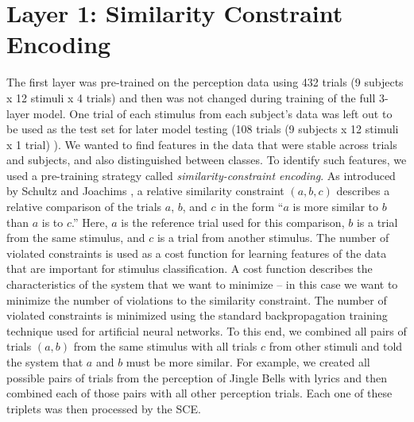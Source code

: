 \section{Layer 1: Similarity Constraint Encoding}
The first layer was pre-trained on the perception data using 432 trials (9 subjects x 12 stimuli x 4 trials) and then was not changed during training of the full 3-layer model. 
One trial of each stimulus from each subject's data was left out to be used as the test set for later model testing (108 trials (9 subjects x 12 stimuli x 1 trial) ).
We wanted to find features in the data that were stable across trials and subjects, and also distinguished between classes. 
To identify such features, we used a pre-training strategy called \emph{similarity-constraint encoding}.
As introduced by Schultz and Joachims \citeyear{schultz_learning_2004}, a relative similarity constraint $(a,b,c)$ describes a relative comparison of the trials $a$, $b$, and $c$ in the form ``$a$ is more similar to $b$ than $a$ is to $c$.''
Here, $a$ is the reference trial used for this comparison, $b$ is a trial from the same stimulus, and $c$ is a trial from another stimulus.
The number of violated constraints is used as a cost function for learning features of the data that are important for stimulus classification. 
A cost function describes the characteristics of the system that we want to minimize -- in this case we want to minimize the number of violations to the similarity constraint.
The number of violated constraints is minimized using the standard backpropagation training technique used for artificial neural networks.
To this end, we combined all pairs of trials $(a,b)$ from the same stimulus with all trials $c$ from other stimuli and told the system that $a$ and $b$ must be more similar.
For example, we created all possible pairs of trials from the perception of Jingle Bells with lyrics and then combined each of those pairs with all other perception trials.
Each one of these triplets was then processed by the \ac{SCE}. %
